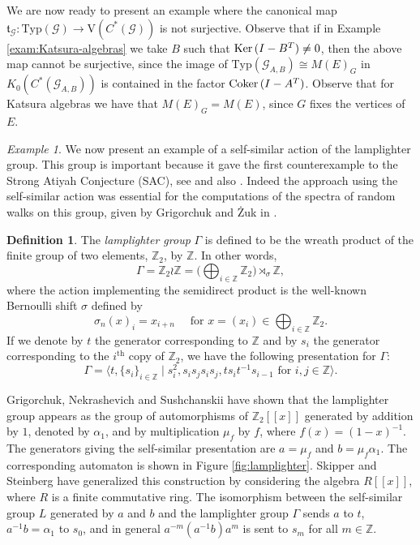 \documentclass[11pt]{amsart}
\theoremstyle{plain}            %
\theoremstyle{definition}       %
\newtheorem{definition}[theorem]{Definition}
\theoremstyle{definition}       %
\theoremstyle{remark}
\newtheorem{example}[theorem]{Example}
\newcommand{\V}{\mathrm{V}}
\newcommand{\Typ}{\mathrm{Typ}}
\def\Z{\mathbb{Z}}
\def\ker{{\rm Ker}\,}
\def\coker{{\rm Coker}\,}
\def\ker{{\rm Ker}\,}
\begin{document}
\medskip


We are now ready to present an example where the canonical map $\mathfrak{t}_{\mathcal G} \colon \Typ (\mathcal G)\to \V (C^*(\mathcal G))$ is not surjective. Observe that if in Example \ref{exam:Katsura-algebras} we take $B$ such that $\ker (I-B^T)\ne 0$,  then the above map cannot be surjective, since the image of $\Typ  (\mathcal G_{A,B}) \cong M(E)_G$ in $K_0(C^*(\mathcal G_{A,B}))$ is contained in the factor $\coker (I-A^T)$. Observe that for Katsura algebras we have that $M(E)_G=M(E)$, since $G$ fixes the vertices of $E$. 


\begin{example}
	\label{exam:lamplighter}
	We now present an example of a self-similar action of the lamplighter group. 
	This group is important because it gave the first counterexample to the Strong Atiyah Conjecture (SAC), see \cite{GZ} and also \cite{DiSc, Gra, AC21}. Indeed the approach using the self-similar action was essential for the computations of the spectra of random walks on this group, given by Grigorchuk and  Żuk in \cite{GZ}. 
	
	\begin{definition}
    \label{def:lamplighter}
		The \emph{lamplighter group} $\Gamma$ is defined to be the wreath product of the finite group of two elements, $\Z_2$, by $\Z$. In other words,
		$$\Gamma = \Z_2 \wr \Z = \Big( \bigoplus_{i \in \Z} \Z_2 \Big) \rtimes_{\sigma} \Z,$$
		where the action implementing the semidirect product is the well-known Bernoulli shift $\sigma$ defined by
		$$\sigma_n(x)_i = x_{i+n} \quad \text{ for }x = (x_i) \in \bigoplus_{i \in \Z} \Z_2.$$
		If we denote by $t$ the generator corresponding to $\Z$ and by $s_i$ the generator corresponding to the $i^{\text{th}}$ copy of $\Z_2$, we have the following presentation for $\Gamma$:
		$$\Gamma = \langle t,\{s_i\}_{i \in \Z} \mid s_i^2 , s_is_js_is_j, ts_it^{-1}s_{i-1} \text{ for } i,j \in \Z \rangle.$$
	\end{definition}
	

	Grigorchuk, Nekrashevich and Sushchanskii \cite{GNS00} have shown that the lamplighter group appears as the group of automorphisms of $\Z_2[[x]]$ generated by addition by $1$, denoted by $\alpha_1$, and by multiplication $\mu_f$ by $f$, where $f(x)=(1-x)^{-1}$. The generators giving the self-similar presentation are $a= \mu_f$ and $b=\mu_f\alpha_1$. The corresponding automaton is shown in Figure \ref{fig:lamplighter}. 	
	Skipper and Steinberg \cite{SS20} have generalized this construction by considering the algebra $R[[x]]	$, where $R$ is a finite commutative ring. The isomorphism between the self-similar group $L$ generated by $a$ and $b$ and the lamplighter group $\Gamma$ sends $a$ to $t$,  $a^{-1}b= \alpha_1$ to $s_0$, and in general
	$a^{-m}(a^{-1}b)a^m$ is sent to $s_m$ for all $m\in \Z$.  
\end{example}
\end{document}
